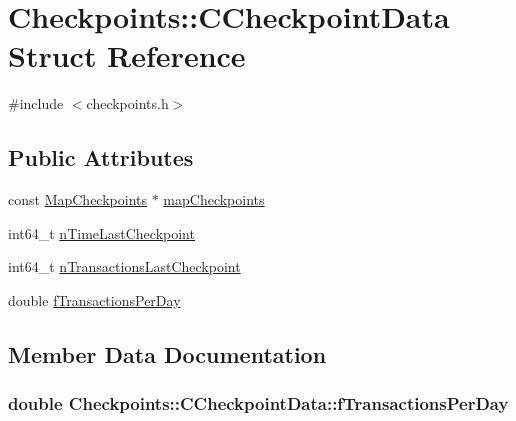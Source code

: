 \hypertarget{struct_checkpoints_1_1_c_checkpoint_data}{}\section{Checkpoints\+:\+:C\+Checkpoint\+Data Struct Reference}
\label{struct_checkpoints_1_1_c_checkpoint_data}


{\ttfamily \#include $<$checkpoints.\+h$>$}

\subsection*{Public Attributes}
\begin{DoxyCompactItemize}
\item 
const \hyperlink{namespace_checkpoints_a996cca530c4568a2eb4516e8f351b9a2}{Map\+Checkpoints} $\ast$ \hyperlink{struct_checkpoints_1_1_c_checkpoint_data_ab4aa42cde482f7cf7ab015abbf7108cb}{map\+Checkpoints}
\item 
int64\+\_\+t \hyperlink{struct_checkpoints_1_1_c_checkpoint_data_a49124425a3f9ccddba8bce3dd67ad3b3}{n\+Time\+Last\+Checkpoint}
\item 
int64\+\_\+t \hyperlink{struct_checkpoints_1_1_c_checkpoint_data_ad659d70f627b0c4529fc0e71f568de70}{n\+Transactions\+Last\+Checkpoint}
\item 
double \hyperlink{struct_checkpoints_1_1_c_checkpoint_data_a9119b43d2bc8e47df84f14c230a1762d}{f\+Transactions\+Per\+Day}
\end{DoxyCompactItemize}


\subsection{Member Data Documentation}
\hypertarget{struct_checkpoints_1_1_c_checkpoint_data_a9119b43d2bc8e47df84f14c230a1762d}{}
\subsubsection[{f\+Transactions\+Per\+Day}]{\setlength{\rightskip}{0pt plus 5cm}double Checkpoints\+::\+C\+Checkpoint\+Data\+::f\+Transactions\+Per\+Day}\label{struct_checkpoints_1_1_c_checkpoint_data_a9119b43d2bc8e47df84f14c230a1762d}
\hypertarget{struct_checkpoints_1_1_c_checkpoint_data_ab4aa42cde482f7cf7ab015abbf7108cb}{}
